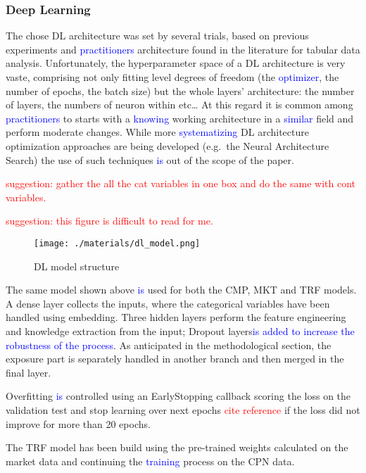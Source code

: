 \documentclass[
]{article}
\begin{document}
\hypertarget{deep-learning-1}{%
\subsubsection{Deep Learning}\label{deep-learning-1}}

The chose DL architecture was set by several trials, based on previous
experiments and \textcolor{blue}{practitioners} architecture found in
the literature for tabular data analysis. Unfortunately, the
hyperparameter space of a DL architecture is very vaste, comprising not
only fitting level degrees of freedom (the \textcolor{blue}{optimizer},
the number of epochs, the batch size) but the whole layers'
architecture: the number of layers, the numbers of neuron within
etc\ldots{} At this regard it is common among
\textcolor{blue}{practitioners} to starts with a
\textcolor{blue}{knowing} working architecture in a
\textcolor{blue}{similar} field and perform moderate changes. While more
\textcolor{blue}{systematizing} DL architecture optimization approaches
are being developed (e.g.~the Neural Architecture Search) the use of
such techniques \textcolor{blue}{is} out of the scope of the paper.

\textcolor{red}{suggestion: gather the all the cat variables in one box and do the same with cont variables.}

\textcolor{red}{suggestion: this figure is difficult to read for me.}

\begin{figure}
\centering
\texttt{[image: ./materials/dl\_model.png]}
\caption{DL model structure}
\end{figure}

The same model shown above \textcolor{blue}{is} used for both the CMP,
MKT and TRF models. A dense layer collects the inputs, where the
categorical variables have been handled using embedding. Three hidden
layers perform the feature engineering and knowledge extraction from the
input; Dropout
layers\textcolor{blue}{is added to increase the robustness of the process}.
As anticipated in the methodological section, the exposure part is
separately handled in another branch and then merged in the final layer.

Overfitting \textcolor{blue}{is} controlled using an EarlyStopping
callback scoring the loss on the validation test and stop learning over
next epochs \textcolor{red}{cite reference} if the loss did not improve
for more than 20 epochs.

The TRF model has been build using the pre-trained weights calculated on
the market data and continuing the \textcolor{blue}{training} process on
the CPN data.
\end{document}
